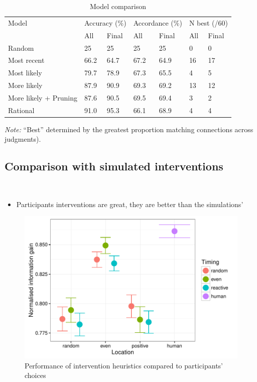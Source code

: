 \documentclass[12pt]{article}
\newcommand{\ntodo}[2][]
{\todo[caption={#2}, size=\small, #1, color = yellow, inline]{\renewcommand{\baselinestretch}{1}\selectfont \textbf{NB}: #2}~}
\begin{document}
\begin{table}[ht]
\centering
\caption{Model comparison}
\label{table:incremental_construction}
\footnotesize{
\begin{tabularx}{\columnwidth}{lXXXXXX}
\toprule
Model & \multicolumn{2}{l}{Accuracy (\%)}  & \multicolumn{2}{l}{Accordance (\%)}  & \multicolumn{2}{l}{N best (/60)}  \\ 
 & All & Final & All & Final & All & Final\\
\hline
Random & 25 & 25 & 25 & 25 & 0 & 0 \\
Most recent & 66.2 & 64.7 & 67.2 & 64.9 & 16 & 17 \\ 
  Most likely & 79.7 & 78.9 & 67.3 & 65.5 &  4 &  5 \\ 
  More likely & 87.9 & 90.9 & 69.3 & 69.2 & 13 & 12 \\ 
  More likely + Pruning & 87.6 & 90.5 & 69.5 & 69.4 &  3 &  2 \\ 
  Rational & 91.0 & 95.3 & 66.1 & 68.9 &  4 &  4 \\ 
   \bottomrule
\end{tabularx}}
\footnotesize{\emph{Note:} ``Best'' determined by the greatest proportion matching connections across judgments).}\raggedright
\end{table}

\FloatBarrier


\subsection{Comparison with simulated interventions}
\ntodo{New stuff}

\begin{itemize}
  \item Participants interventions are great, they are better than the simulations'
\end{itemize}



\begin{figure}[h]
   \centering
   \includegraphics[width = .5\columnwidth]{int_sim_performance}
   \caption{Performance of intervention heuristics compared to participants' choices}
   \label{fig:int_sim_performance}
\end{figure}
\end{document}
